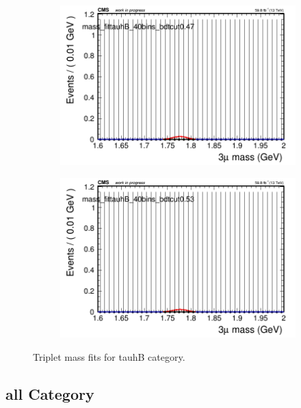 \begin{figure}[H]
\begin{subfigure}{0.2\textwidth}
        \caption{}
    \end{subfigure}
    \begin{subfigure}{0.2\textwidth}
        \includegraphics[width=\textwidth]{flat_fit/plots/tauhB/massfit_tauhB_40bins_bdtcut0.47.png}
        \caption{}
    \end{subfigure}
    \begin{subfigure}{0.2\textwidth}
        \includegraphics[width=\textwidth]{flat_fit/plots/tauhB/massfit_tauhB_40bins_bdtcut0.53.png}
        \caption{}
    \end{subfigure}
    \caption{Triplet mass fits for tauhB category.}
    \label{fig:flatfittauhB}
\end{figure}

\subsection{all Category}
\label{sec:flatfitall}

